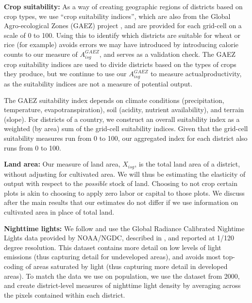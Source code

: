 \documentclass[11pt]{article}
\begin{document}
\vspace{.5cm}\noindent\textbf{Crop suitability:} As a way of creating geographic regions of districts based on crop types, we use ``crop suitability indices'', which are also from the Global Agro-ecological Zones (GAEZ) project \citep{gaez}, and are provided for each grid-cell on a scale of 0 to 100. Using this to identify which districts are suitable for wheat or rice (for example) avoids errors we may have introduced by introducing calorie counts to our measure of $A^{GAEZ}_{isg}$, and serves as a validation check. The GAEZ crop suitability indices are used to divide districts based on the types of crops they produce, but we continue to use our $A^{GAEZ}_{isg}$ to measure actualproductivity, as the suitability indices are not a measure of potential output.

The GAEZ suitability index depends on climate conditions (precipitation, temperature, evapotranspiration), soil (acidity, nutrient availability), and terrain (slope). For districts of a country, we construct an overall suitability index as a weighted (by area) sum of the grid-cell suitability indices. Given that the grid-cell suitability measures run from 0 to 100, our aggregated index for each district also runs from 0 to 100.

\vspace{.5cm}\noindent\textbf{Land area:} Our measure of land area, $X_{isg}$, is the total land area of a district, without adjusting for cultivated area. We will thus be estimating the elasticity of output with respect to the \textit{possible} stock of land. Choosing to not crop certain plots is akin to choosing to apply zero labor or capital to those plots. We discuss after the main results that our estimates do not differ if we use information on cultivated area in place of total land.

\vspace{.5cm}\noindent\textbf{Nighttime lights:} We follow \citet{hssw2016} and use the Global Radiance Calibrated Nightime Lights data provided by NOAA/NGDC, described in \citet{Elvidge1999}, and reported at 1/120 degree resolution. This dataset contains more detail on low levels of light emissions (thus capturing detail for undeveloped areas), and avoids most top-coding of areas saturated by light (thus capturing more detail in developed areas). To match the data we use on population, we use the dataset from 2000, and create district-level measures of nighttime light density by averaging across the pixels contained within each district.
\end{document}
